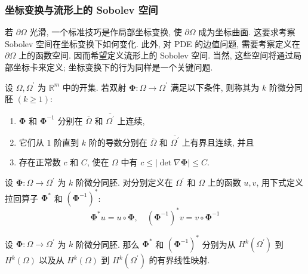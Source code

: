\subsubsection{坐标变换与流形上的 Sobolev 空间}\label{subsec:sobolev-coordinate-transformations-manifolds}

若 $\partial\Omega$ 光滑, 一个标准技巧是作局部坐标变换, 使 $\partial\Omega$ 成为坐标曲面. 这要求考察 Sobolev 空间在坐标变换下如何变化. 此外, 对 PDE 的边值问题, 需要考察定义在 $\partial\Omega$ 上的函数空间. 因而希望定义流形上的 Sobolev 空间. 当然, 这些空间将通过局部坐标卡来定义; 坐标变换下的行为同样是一个关键问题.

\begin{Definition}
\label{def:sobolev-k-diffeomorphism}
设 $\Omega,\Omega^{\prime}$ 为 $\mathbb{R}^m$ 中的开集. 若双射 $\bm{\Phi}:\Omega\to\Omega^{\prime}$ 满足以下条件, 则称其为 $k$ 阶微分同胚 $(k\geq1)$:\begin{enumerate}
\item $\bm{\Phi}$ 和 $\bm{\Phi}^{-1}$ 分别在 $\overline\Omega$ 和 $\overline{\Omega^{\prime}}$ 上连续,
\item 它们从 $1$ 阶直到 $k$ 阶的导数分别在 $\overline\Omega$ 和 $\overline{\Omega^{\prime}}$ 上有界且连续, 并且
\item 存在正常数 $c$ 和 $C$, 使在 $\Omega$ 中有 $c\leq|\det\nabla\bm{\Phi}|\leq C$.
\end{enumerate}
\end{Definition}

\begin{Definition}
\label{def:sobolev-diffeomorphism-pullbacks}
设 $\bm{\Phi}:\Omega\to\Omega^{\prime}$ 为 $k$ 阶微分同胚. 对分别定义在 $\Omega^{\prime}$ 和 $\Omega$ 上的函数 $u,v$, 用下式定义拉回算子 $\bm{\Phi}^*$ 和 $(\bm{\Phi}^{-1})^*$:
\begin{equation}\label{eq:sobolev-diffeomorphism-pullback-definitions}
\bm{\Phi}^*u=u\circ\bm{\Phi},\quad(\bm{\Phi}^{-1})^*v=v\circ\bm{\Phi}^{-1}
\end{equation}

\end{Definition}

\begin{Theorem}
\label{thm:sobolev-integer-order-pullback}
设 $\bm{\Phi}:\Omega\to\Omega^{\prime}$ 为 $k$ 阶微分同胚. 那么 $\bm{\Phi}^*$ 和 $(\bm{\Phi}^{-1})^*$ 分别为从 $H^k(\Omega^{\prime})$ 到 $H^k(\Omega)$ 以及从 $H^k(\Omega)$ 到 $H^k(\Omega^{\prime})$ 的有界线性映射.
\end{Theorem}

